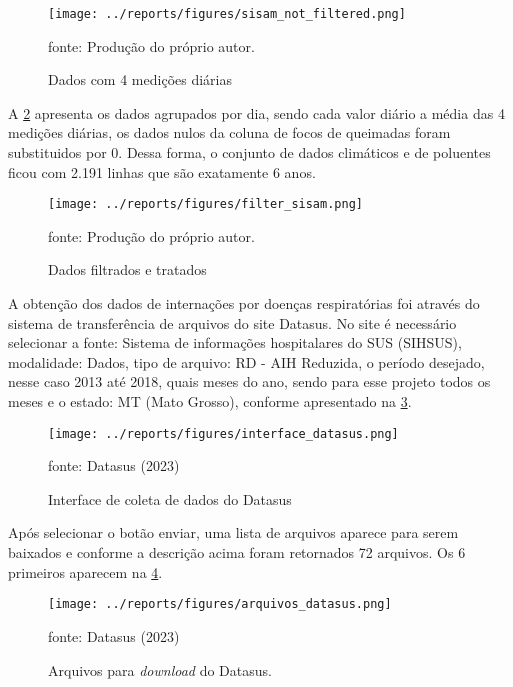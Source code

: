 \documentclass[
  12pt,		%
  a4paper,	%
  openright,%
  oneside,	%
  chapter=TITLE,		%
  section=TITLE,		%
  english,	%
  french,	%
  spanish,	%
  brazil	%
]{abntex2}
\begin{document}
    \begin{figure}[ht]
        \centering
        \caption{Dados com 4 medições diárias}
        \texttt{[image: ../reports/figures/sisam\_not\_filtered.png]}
        \label{sisam_not_filtered}
        \par
        {\small fonte: Produção do próprio autor.}
    \end{figure}

    A \ref*{sisam_filtered} apresenta os dados agrupados por dia, sendo cada valor diário a média das 4 medições diárias, os dados
    nulos da coluna de focos de queimadas foram substituidos por 0. Dessa forma, o conjunto de dados climáticos e de poluentes ficou
    com 2.191 linhas que são exatamente 6 anos.

    \begin{figure}[ht]
        \centering
        \caption{Dados filtrados e tratados}
        \texttt{[image: ../reports/figures/filter\_sisam.png]}
        \label{sisam_filtered}
        \par
        {\small fonte: Produção do próprio autor.}
    \end{figure}

    A obtenção dos dados de internações por doenças respiratórias foi através do sistema de transferência
    de arquivos do site Datasus. No site é necessário selecionar a fonte: Sistema de informações hospitalares do SUS (SIHSUS),
    modalidade: Dados, tipo de arquivo: RD - AIH Reduzida, o período desejado, nesse caso 2013 até 2018, quais meses do ano, sendo
    para esse projeto todos os meses e o estado: MT (Mato Grosso), conforme apresentado na \ref*{interface_datasus}.

    \begin{figure}[ht]
        \centering
        \caption{Interface de coleta de dados do Datasus}
        \texttt{[image: ../reports/figures/interface\_datasus.png]}
        \label{interface_datasus}
        \par
        {\small fonte: Datasus (2023)}
    \end{figure}

    Após selecionar o botão enviar, uma lista de arquivos aparece para serem baixados e conforme a descrição acima foram
    retornados 72 arquivos. Os 6 primeiros aparecem na \ref*{arquivos_datasus}.

    \begin{figure}[ht]
        \centering
        \caption{Arquivos para \textit{download} do Datasus.}
        \texttt{[image: ../reports/figures/arquivos\_datasus.png]}
        \label{arquivos_datasus}
        \par
        {\small fonte: Datasus (2023)}
    \end{figure}
\end{document}
